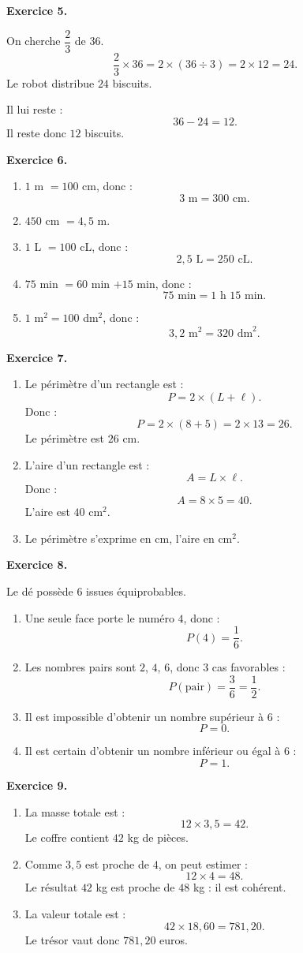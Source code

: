 \documentclass[11pt,a4paper]{article}
\newcommand{\corrige}[2]{
\begin{corrigebox}
\textbf{Exercice #1.}

#2
\end{corrigebox}
}
\begin{document}
\corrige{5}{
On cherche $\dfrac{2}{3}$ de $36$.
\[
\frac{2}{3}\times 36=2\times(36\div 3)=2\times 12=24.
\]
Le robot distribue $24$ biscuits.

Il lui reste :
\[
36-24=12.
\]
Il reste donc $12$ biscuits.
}

\corrige{6}{
\begin{enumerate}[label=\arabic*)]
\item $1$ m $=100$ cm, donc :
\[
3\text{ m}=300\text{ cm}.
\]
\item $450$ cm $=4,5$ m.
\item $1$ L $=100$ cL, donc :
\[
2,5\text{ L}=250\text{ cL}.
\]
\item $75$ min $=60$ min $+15$ min, donc :
\[
75\text{ min}=1\text{ h }15\text{ min}.
\]
\item $1$ m$^2=100$ dm$^2$, donc :
\[
3,2\text{ m}^2=320\text{ dm}^2.
\]
\end{enumerate}
}

\corrige{7}{
\begin{enumerate}[label=\arabic*)]
\item Le périmètre d'un rectangle est :
\[
P=2\times(L+\ell).
\]
Donc :
\[
P=2\times(8+5)=2\times 13=26.
\]
Le périmètre est $26$ cm.
\item L'aire d'un rectangle est :
\[
A=L\times \ell.
\]
Donc :
\[
A=8\times 5=40.
\]
L'aire est $40$ cm$^2$.
\item Le périmètre s'exprime en cm, l'aire en cm$^2$.
\end{enumerate}
}

\corrige{8}{
Le dé possède $6$ issues équiprobables.
\begin{enumerate}[label=\arabic*)]
\item Une seule face porte le numéro $4$, donc :
\[
P(4)=\frac{1}{6}.
\]
\item Les nombres pairs sont $2$, $4$, $6$, donc $3$ cas favorables :
\[
P(\text{pair})=\frac{3}{6}=\frac{1}{2}.
\]
\item Il est impossible d'obtenir un nombre supérieur à $6$ :
\[
P=0.
\]
\item Il est certain d'obtenir un nombre inférieur ou égal à $6$ :
\[
P=1.
\]
\end{enumerate}
}

\corrige{9}{
\begin{enumerate}[label=\arabic*)]
\item La masse totale est :
\[
12\times 3,5=42.
\]
Le coffre contient $42$ kg de pièces.
\item Comme $3,5$ est proche de $4$, on peut estimer :
\[
12\times 4=48.
\]
Le résultat $42$ kg est proche de $48$ kg : il est cohérent.
\item La valeur totale est :
\[
42\times 18,60=781,20.
\]
Le trésor vaut donc $781,20$ euros.
\end{enumerate}
}
\end{document}
